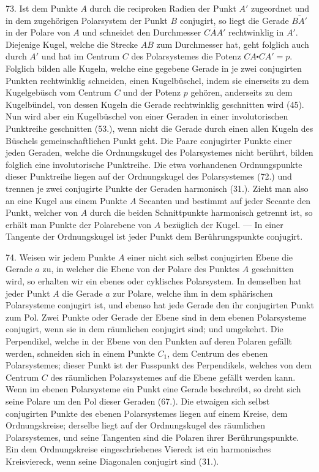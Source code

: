 73. Ist dem Punkte $A$ durch die reciproken Radien der
Punkt $A'$ zugeordnet und in dem zugeh\"origen Polarsystem
der Punkt $B$ conjugirt, so liegt die Gerade $\overline{BA'}$ in der Polare
von $A$ und schneidet den Durchmesser $\overline{CAA'}$ rechtwinklig
in $A'$. Diejenige Kugel, welche die Strecke $AB$ zum
Durchmesser hat, geht folglich auch durch $A'$ und hat im
Centrum $C$ des Polarsystemes die Potenz $CA \centerdot CA' = p$.
Folglich bilden alle Kugeln, welche eine gegebene Gerade
in je zwei conjugirten Punkten rechtwinklig schneiden, einen
Kugelb\"uschel, indem sie einerseits zu dem Kugelgeb\"usch vom
Centrum $C$ und der Potenz $p$ geh\"oren, anderseits zu dem
Kugelb\"undel, von dessen Kugeln die Gerade rechtwinklig
geschnitten wird (45). Nun wird aber ein Kugelb\"uschel von
einer Geraden in einer involutorischen Punktreihe geschnitten
(53.), wenn nicht die Gerade durch einen allen Kugeln
des B\"uschels gemeinschaftlichen Punkt geht. Die Paare
conjugirter Punkte einer jeden Geraden, welche die Ordnungskugel
des Polarsystemes nicht ber\"uhrt, bilden folglich eine
involutorische Punktreihe. Die etwa vorhandenen Ordnungspunkte
dieser Punktreihe liegen auf der Ordnungskugel des
Polarsystemes (72.) und trennen je zwei conjugirte Punkte
der Geraden harmonisch (31.). Zieht man also an eine Kugel
aus einem Punkte $A$ Secanten und bestimmt auf jeder Secante
den Punkt, welcher von $A$ durch die beiden Schnittpunkte
harmonisch getrennt ist, so erh\"alt man Punkte der
Polarebene von $A$ bez\"uglich der Kugel. --- In einer Tangente
der Ordnungskugel ist jeder Punkt dem Ber\"uhrungspunkte
conjugirt.

74. Weisen wir jedem Punkte $A$ einer nicht sich selbst
conjugirten Ebene die Gerade $a$ zu, in welcher die Ebene
von der Polare des Punktes $A$ geschnitten wird, so erhalten
wir ein {\glqq}ebenes oder cyklisches Polarsystem{\grqq}. In demselben
hat jeder Punkt $A$ die Gerade $a$ zur Polare, welche ihm in
dem sph\"arischen Polarsysteme conjugirt ist, und ebenso hat
jede Gerade den ihr conjugirten Punkt zum Pol. Zwei
Punkte oder Gerade der Ebene sind in dem ebenen Polarsysteme
conjugirt, wenn sie in dem r\"aumlichen conjugirt
sind; und umgekehrt. Die Perpendikel, welche in der Ebene
von den Punkten auf deren Polaren gef\"allt werden, schneiden
sich in einem Punkte $C_1$, dem {\glqq}Centrum{\grqq} des ebenen
Polarsystemes; dieser Punkt ist der Fusspunkt des Perpendikels,
welches von dem Centrum $C$ des r\"aumlichen Polarsystemes
auf die Ebene gef\"allt werden kann. Wenn im
ebenen Polarsysteme ein Punkt eine Gerade beschreibt, so
dreht sich seine Polare um den Pol dieser Geraden (67.).
Die etwaigen sich selbst conjugirten Punkte des ebenen Polarsystemes
liegen auf einem Kreise, dem {\glqq}Ordnungskreise{\grqq};
derselbe liegt auf der Ordnungskugel des r\"aumlichen Polarsystemes,
und seine Tangenten sind die Polaren ihrer Ber\"uhrungspunkte.
Ein dem Ordnungskreise eingeschriebenes
Viereck ist ein harmonisches Kreisviereck, wenn seine Diagonalen
conjugirt sind (31.).

